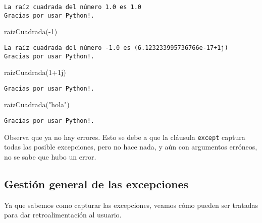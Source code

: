 \documentclass[
  letterpaper,
  DIV=11,
  numbers=noendperiod]{scrreprt}
\newenvironment{Shaded}{\begin{snugshade}}{\end{snugshade}}
\newcommand{\DecValTok}[1]{\textcolor[rgb]{0.68,0.00,0.00}{#1}}
\newcommand{\NormalTok}[1]{\textcolor[rgb]{0.00,0.23,0.31}{#1}}
\newcommand{\OperatorTok}[1]{\textcolor[rgb]{0.37,0.37,0.37}{#1}}
\newcommand{\OtherTok}[1]{\textcolor[rgb]{0.00,0.23,0.31}{#1}}
\newcommand{\StringTok}[1]{\textcolor[rgb]{0.13,0.47,0.30}{#1}}
\begin{document}
\begin{verbatim}
La raíz cuadrada del número 1.0 es 1.0
Gracias por usar Python!.
\end{verbatim}

\begin{Shaded}
\begin{Highlighting}[]
\NormalTok{raizCuadrada(}\OperatorTok{{-}}\DecValTok{1}\NormalTok{)}
\end{Highlighting}
\end{Shaded}

\begin{verbatim}
La raíz cuadrada del número -1.0 es (6.123233995736766e-17+1j)
Gracias por usar Python!.
\end{verbatim}

\begin{Shaded}
\begin{Highlighting}[]
\NormalTok{raizCuadrada(}\DecValTok{1}\OperatorTok{+}\OtherTok{1j}\NormalTok{)}
\end{Highlighting}
\end{Shaded}

\begin{verbatim}
Gracias por usar Python!.
\end{verbatim}

\begin{Shaded}
\begin{Highlighting}[]
\NormalTok{raizCuadrada(}\StringTok{"hola"}\NormalTok{)}
\end{Highlighting}
\end{Shaded}

\begin{verbatim}
Gracias por usar Python!.
\end{verbatim}

Observa que ya no hay errores. Esto se debe a que la cláusula
\texttt{except} captura todas las posible excepciones, pero no hace
nada, y aún con argumentos erróneos, no se sabe que hubo un error.

\subsection{Gestión general de las
excepciones}\label{gestiuxf3n-general-de-las-excepciones}

Ya que sabemos como capturar las excepciones, veamos cómo pueden ser
tratadas para dar retroalimentación al usuario.
\end{document}
